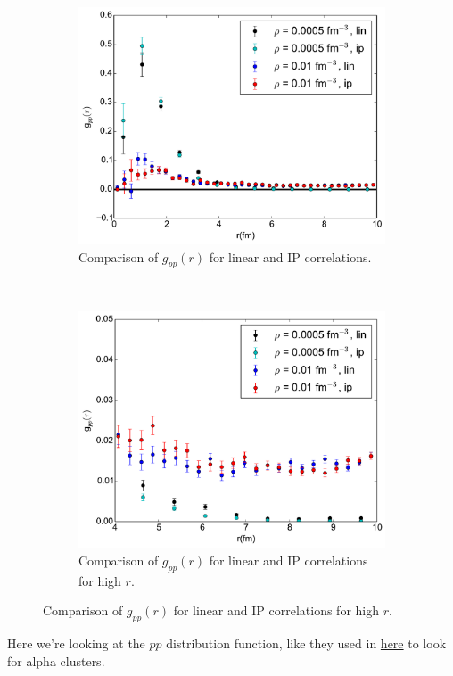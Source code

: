 \documentclass[12pt]{article}
\begin{document}
\begin{figure}[h!]
\begin{subfigure}{0.49\textwidth}
      \includegraphics[width=\textwidth]{../gpp_linVSip.pdf}
      \caption{Comparison of $g_{pp}(r)$ for linear and IP correlations.}
   \end{subfigure}
   ~
   \begin{subfigure}{0.49\textwidth}
      \includegraphics[width=\textwidth]{../gpp_linVSip_small.pdf}
      \caption{Comparison of $g_{pp}(r)$ for linear and IP correlations for high $r$.}
   \end{subfigure}
\end{figure}
Here we're looking at the $pp$ distribution function, like they used in \href{https://journals.aps.org/prl/pdf/10.1103/PhysRevLett.119.222505}{here} to look for alpha clusters.
\newpage



\clearpage


\end{document}

